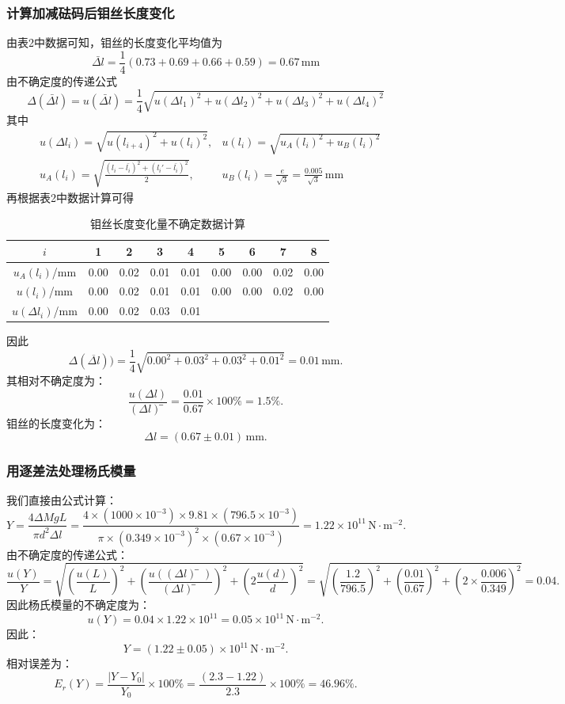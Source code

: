 \documentclass[zihao=5, UTF8]{article}
\theoremstyle{MyLineTheoremStyle} %
\theoremstyle{MyBlockTheoremStyle} %
\theoremstyle{MySubsubsectionStyle} %
\begin{document}
\subsubsection{计算加减砝码后钼丝长度变化}
由表2中数据可知，钼丝的长度变化平均值为
\[
\bar{\Delta l} = \frac{1}{4} (0.73 + 0.69 + 0.66 + 0.59) = 0.67 \, \text{mm}
\]
由不确定度的传递公式
\[
\Delta(\bar{\Delta l}) = u(\bar{\Delta l}) = \frac{1}{4} \sqrt{u(\Delta l_1)^2 + u(\Delta l_2)^2 + u(\Delta l_3)^2 + u(\Delta l_4)^2}
\]
其中
\[
\begin{aligned}
&u(\Delta l_i) = \sqrt{u(l_{i+4})^2 + u(l_i)^2},
&u(l_i) = \sqrt{u_A (l_i)^2 + u_B (l_i)^2} \\
&u_A (l_i) = \sqrt{\frac{(l_i - \bar{l_i})^2 + (l_i' - \bar{l_i})^2}{2}} ,
&u_B (l_i) = \frac{e}{\sqrt{3}} = \frac{0.005}{\sqrt{3}} \, \text{mm}
\end{aligned}
\]
再根据表2中数据计算可得
\begin{table}[H]
    \centering
    \begin{tabular}{|c|c|c|c|c|c|c|c|c|}
        \hline
        $i$ & 1 & 2 & 3 & 4 & 5 & 6 & 7 & 8 \\
        \hline
        $u_A(l_i)$/mm  & 0.00 & 0.02 & 0.01 & 0.01 & 0.00 & 0.00 & 0.02 & 0.00\\
        \hline
        $u(l_i)$/mm  & 0.00 & 0.02 & 0.01 & 0.01 & 0.00 & 0.00 & 0.02 & 0.00\\
        \hline
        $u(\Delta l_i)$/mm  & 0.00 & 0.02 & 0.03 & 0.01 &  &  &  & \\
        \hline
    \end{tabular}
    \caption{钼丝长度变化量不确定数据计算}
\end{table}
因此
\[
\Delta(\overline{\Delta l}) ) = \frac{1}{4} \sqrt{0.00^2 + 0.03^2 + 0.03^2 + 0.01^2} = 0.01 \, \text{mm}.
\]
其相对不确定度为：
\[
\frac{u(\Delta l)}{(\Delta l) ̅} = \frac{0.01}{0.67} \times 100\% = 1.5\%.
\]
钼丝的长度变化为：
\[
\Delta l = (0.67 \pm 0.01) \, \text{mm}.
\]
\subsubsection{用逐差法处理杨氏模量}
我们直接由公式计算：
\[
Y = \frac{4 \Delta M g L}{\pi d^2 \Delta l} = \frac{4 \times (1000 \times 10^{-3}) \times 9.81 \times (796.5 \times 10^{-3})}{\pi \times (0.349 \times 10^{-3})^2 \times (0.67 \times 10^{-3})} = 1.22 \times 10^{11} \, \text{N} \cdot \text{m}^{-2}.
\]
由不确定度的传递公式：
\[
\frac{u(Y)}{Y} = \sqrt{\left(\frac{u(L)}{L}\right)^2 + \left(\frac{u((\Delta l) ̅)}{(\Delta l) ̅}\right)^2 + \left(2 \frac{u(d)}{d}\right)^2} = \sqrt{\left(\frac{1.2}{796.5}\right)^2 + \left(\frac{0.01}{0.67}\right)^2 + \left(2 \times \frac{0.006}{0.349}\right)^2} = 0.04.
\]
因此杨氏模量的不确定度为：
\[
u(Y) = 0.04 \times 1.22 \times 10^{11} = 0.05 \times 10^{11} \, \text{N} \cdot \text{m}^{-2}.
\]
因此：
\[
Y = (1.22 \pm 0.05) \times 10^{11} \, \text{N} \cdot \text{m}^{-2}.
\]
相对误差为：
\[
E_r (Y) = \frac{|Y - Y_0|}{Y_0} \times 100\% = \frac{(2.3 - 1.22)}{2.3} \times 100\% = 46.96\%.
\]
\end{document}
